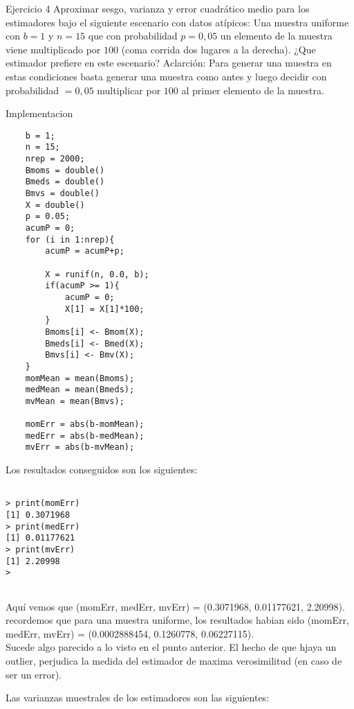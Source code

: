 



\begin{section}{Ejercicio 4}
Aproximar sesgo, varianza y error cuadrático medio para los estimadores bajo el siguiente
escenario con datos atípicos:
Una muestra uniforme con $b = 1$ y $n = 15$ que con probabilidad $p = 0,05$ un elemento de la
muestra viene multiplicado por $100$ (coma corrida dos lugares a la derecha). ¿Que estimador
prefiere en este escenario?
Aclarción: Para generar una muestra en estas condiciones basta generar una muestra como
antes y luego decidir con probabilidad $ = 0,05$ multiplicar por $100$ al primer elemento de la
muestra.

\begin{subsection}{Implementacion}



\begin{verbatim}
	b = 1;
	n = 15;
	nrep = 2000;
	Bmoms = double()
	Bmeds = double()
	Bmvs = double()
	X = double()
	p = 0.05;
	acumP = 0;
	for (i in 1:nrep){
		acumP = acumP+p;

		X = runif(n, 0.0, b);
		if(acumP >= 1){
			acumP = 0;
			X[1] = X[1]*100;
		}
		Bmoms[i] <- Bmom(X);
		Bmeds[i] <- Bmed(X);
		Bmvs[i] <- Bmv(X);
	}
	momMean = mean(Bmoms);
	medMean = mean(Bmeds);
	mvMean = mean(Bmvs);

	momErr = abs(b-momMean);
	medErr = abs(b-medMean);
	mvErr = abs(b-mvMean);

\end{verbatim}
Los resultados conseguidos son los siguientes:

\begin{verbatim}

> print(momErr)
[1] 0.3071968
> print(medErr)
[1] 0.01177621
> print(mvErr)
[1] 2.20998
> 


\end{verbatim}
Aquí vemos que  (momErr, medErr, mvErr) = (0.3071968, 0.01177621, 2.20998).\\
recordemos que para una muestra uniforme, los resultados habian sido (momErr, medErr, mvErr) = (0.0002888454, 0.1260778, 0.06227115).\\
Sucede algo parecido a lo visto en el punto anterior. El hecho de que hjaya un outlier, perjudica la medida del estimador de maxima verosimilitud (en caso de ser un error).

Las varianzas muestrales de los estimadores son las siguientes:

\begin{verbatim}


\end{verbatim}
\end{subsection}
\end{section}
